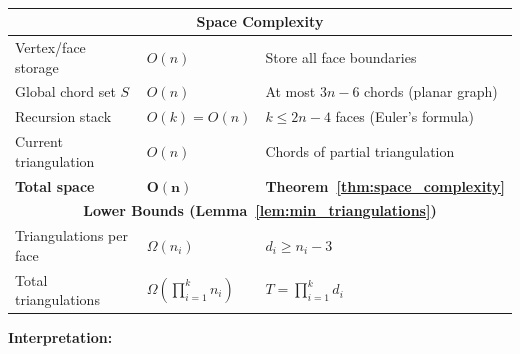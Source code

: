 ﻿﻿\documentclass[12pt,a4paper]{article}
\theoremstyle{definition}
\theoremstyle{remark}
\begin{document}
\begin{table}[H]
\begin{tabular}{|l|l|p{6.5cm}|}
		\hline
		\multicolumn{3}{|c|}{\textbf{Space Complexity}}                                                                                                     \\
		\hline
		Vertex/face storage                  & $O(n)$                                   & Store all face boundaries                                         \\
		\hline
		Global chord set $S$                 & $O(n)$                                   & At most $3n-6$ chords (planar graph)                              \\
		\hline
		Recursion stack                      & $O(k) = O(n)$                            & $k \leq 2n-4$ faces (Euler's formula)                             \\
		\hline
		Current triangulation                & $O(n)$                                   & Chords of partial triangulation                                   \\
		\hline
		\textbf{Total space}                 & $\mathbf{O(n)}$                          & \textbf{Theorem~\ref{thm:space_complexity}}                       \\
		\hline
		\multicolumn{3}{|c|}{\textbf{Lower Bounds (Lemma~\ref{lem:min_triangulations})}}                                                                    \\
		\hline
		Triangulations per face              & $\Omega(n_i)$                            & $d_i \geq n_i - 3$                                                \\
		\hline
		Total triangulations                 & $\Omega\left(\prod_{i=1}^{k} n_i\right)$ & $T = \prod_{i=1}^{k} d_i$                                         \\
		\hline
	\end{tabular}
\end{table}

\textbf{Interpretation:}
\end{document}
